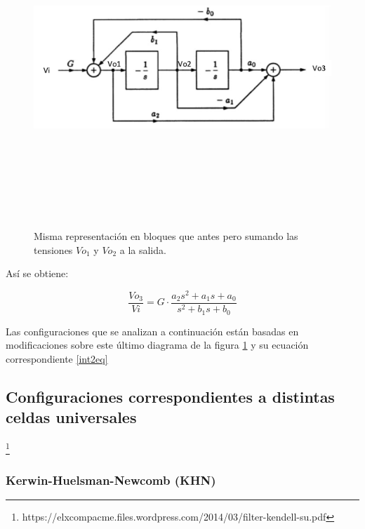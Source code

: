 \begin{figure}[H] %
	\centering
	\includegraphics[width=12cm,height=12cm,keepaspectratio]{../EJ4/imagenes/int2.png}
	\caption{Misma representaci\'on en bloques que antes pero sumando las tensiones $Vo_1$ y $Vo_2$ a la salida.}
	\label{int2}
\end{figure}

As\'i se obtiene:

\begin{equation}
	\frac{Vo_3}{Vi} = G \cdot \frac{a_2s^2+a_1s+a_0}{s^2+b_1s+b_0}
	\label{int2eq}
\end{equation}

Las configuraciones que se analizan a continuaci\'on est\'an basadas en modificaciones sobre este \'ultimo diagrama de la figura \ref{int2} y su ecuaci\'on correspondiente \ref{int2eq}

\subsection{Configuraciones correspondientes a distintas celdas universales}

\footnote{https://elxcompacme.files.wordpress.com/2014/03/filter-kendell-su.pdf}
\subsubsection{Kerwin-Huelsman-Newcomb (KHN)}

